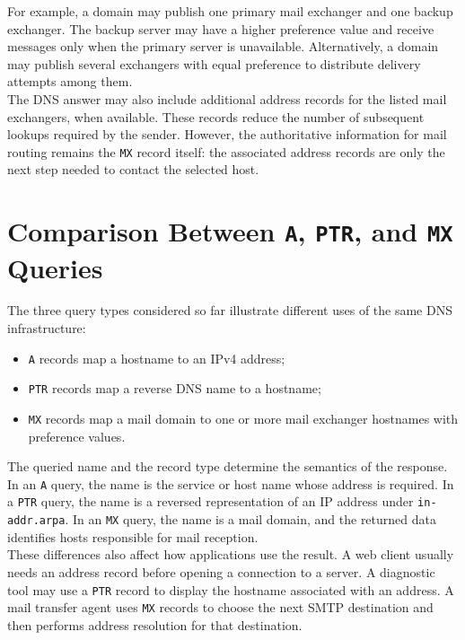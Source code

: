 \documentclass{scrbook}
\begin{document}
	For example, a domain may publish one primary mail exchanger and one backup exchanger. The backup server may have a higher preference value and receive messages only when the primary server is unavailable. Alternatively, a domain may publish several exchangers with equal preference to distribute delivery attempts among them.\\
	
	The DNS answer may also include additional address records for the listed mail exchangers, when available. These records reduce the number of subsequent lookups required by the sender. However, the authoritative information for mail routing remains the \texttt{MX} record itself: the associated address records are only the next step needed to contact the selected host.
	
	\section{Comparison Between \texttt{A}, \texttt{PTR}, and \texttt{MX} Queries}
	
	The three query types considered so far illustrate different uses of the same DNS infrastructure:
	\begin{itemize}
	    \item \texttt{A} records map a hostname to an IPv4 address;
	    \item \texttt{PTR} records map a reverse DNS name to a hostname;
	    \item \texttt{MX} records map a mail domain to one or more mail exchanger hostnames with preference values.
	\end{itemize}
	
	The queried name and the record type determine the semantics of the response. In an \texttt{A} query, the name is the service or host name whose address is required. In a \texttt{PTR} query, the name is a reversed representation of an IP address under \texttt{in-addr.arpa}. In an \texttt{MX} query, the name is a mail domain, and the returned data identifies hosts responsible for mail reception.\\
	
	These differences also affect how applications use the result. A web client usually needs an address record before opening a connection to a server. A diagnostic tool may use a \texttt{PTR} record to display the hostname associated with an address. A mail transfer agent uses \texttt{MX} records to choose the next SMTP destination and then performs address resolution for that destination.
	
\end{document}
